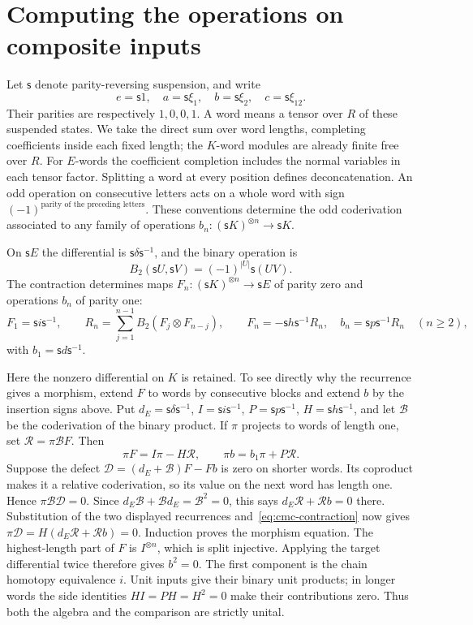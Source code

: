 \section{Computing the operations on composite inputs}
\label{sec:cmc-transfer}

Let \(\mathsf{s}\) denote parity-reversing suspension, and write
\[
 e=\mathsf{s}1,\quad a=\mathsf{s}\xi_1,\quad b=\mathsf{s}\xi_2,\quad c=\mathsf{s}\xi_{12}.
\]
Their parities are respectively \(1,0,0,1\).
A word means a tensor over \(R\) of these suspended states.
We take the direct sum over word lengths, completing coefficients
inside each fixed length; the \(K\)-word modules are already finite
free over \(R\). For \(E\)-words the coefficient completion includes
the normal variables in each tensor factor.
Splitting a word
at every position defines deconcatenation. An odd operation on
consecutive letters acts on a whole word with sign
\((-1)^{\text{parity of the preceding letters}}\).
These conventions determine the odd coderivation associated to
any family of operations \(b_n:(\mathsf{s}K)^{\otimes n}\to \mathsf{s}K\).

On \(\mathsf{s}E\) the differential is \(\mathsf{s}\delta\mathsf{s}^{-1}\), and the binary
operation is
\[
 B_2(\mathsf{s}U,\mathsf{s}V)=(-1)^{|U|}\mathsf{s}(UV).
\]
The contraction determines maps \(F_n:(\mathsf{s}K)^{\otimes n}\to \mathsf{s}E\)
of parity zero and operations \(b_n\) of parity one:
\begin{equation}\label{eq:cmc-recursion}
 F_1=\mathsf{s}i\mathsf{s}^{-1},\qquad
 R_n=\sum_{j=1}^{n-1}B_2(F_j\otimes F_{n-j}),\qquad
 F_n=-\mathsf{s}h\mathsf{s}^{-1}R_n,\quad b_n=\mathsf{s}p\mathsf{s}^{-1}R_n\quad(n\ge2),
\end{equation}
with \(b_1=\mathsf{s}d\mathsf{s}^{-1}\).

Here the nonzero differential on \(K\) is retained. To see directly
why the recurrence gives a morphism, extend \(F\) to words by
consecutive blocks and extend \(b\) by the insertion signs above.
Put \(d_E=\mathsf{s}\delta\mathsf{s}^{-1}\), \(I=\mathsf{s}i\mathsf{s}^{-1}\),
\(P=\mathsf{s}p\mathsf{s}^{-1}\), \(H=\mathsf{s}h\mathsf{s}^{-1}\), and let \(\mathcal B\) be the coderivation
of the binary product. If \(\pi\) projects to words of length one,
set \(\mathcal R=\pi\mathcal B F\). Then
\[
 \pi F=I\pi-H\mathcal R,\qquad
 \pi b=b_1\pi+P\mathcal R.
\]
Suppose the defect \(\mathcal D=(d_E+\mathcal B)F-Fb\) is zero on shorter
words. Its coproduct makes it a relative coderivation, so its value
on the next word has length one. Hence \(\pi\mathcal B\mathcal D=0\).
Since \(d_E\mathcal B+\mathcal B d_E=\mathcal B^2=0\), this says
\(d_E\mathcal R+\mathcal Rb=0\) there.
Substitution of the two displayed recurrences
and~\eqref{eq:cmc-contraction} now gives
\(\pi\mathcal D=H(d_E\mathcal R+\mathcal Rb)=0\).
Induction proves the morphism equation. The highest-length part
of \(F\) is \(I^{\otimes n}\), which is split injective.
Applying the target differential twice therefore gives \(b^2=0\).
The first component is the chain homotopy equivalence \(i\).
Unit inputs give their binary unit products; in longer words
the side identities \(HI=PH=H^2=0\) make their contributions zero.
Thus both the algebra and the comparison are strictly unital.

